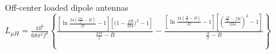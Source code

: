 \documentclass[fleqn]{article}
\begin{document}
\hsize=14cm
	
	\begin{center}
		{\LARGE Off-center loaded dipole antennas} \bigbreak
		$
			L_{\mu H} = \frac{10 ^ 6}{68 \pi ^ 2 f ^ 2}
			\left\lbrace
				\frac
				{
					\left\lbrack
					\ln \frac{24\left(\frac{234}{f} - B\right)}{D} - 1
					\right\rbrack
					\left\lbrack
					\bigl (1 - \frac{fB}{234} \bigr) ^ 2 - 1
					\right\rbrack
				}
				{
					\frac{234}{f} - B
				}
				-
				\frac
				{
					\left\lbrack
					\ln \frac{24\left(\frac{A}{2} - B\right)}{D} - 1
					\right\rbrack
					\left\lbrack
					\left(\frac{\frac{fA}{2} - fB}{234}\right) ^ 2 - 1
					\right\rbrack
				}
				{
					\frac{A}{2} - B
				}
			\right\rbrace
		$
	\end{center}
\end{document}
